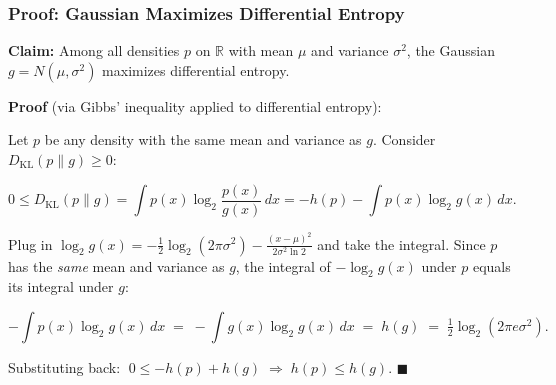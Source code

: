 \documentclass[aspectratio=169]{beamer}
\begin{document}
\begin{frame}
\frametitle{Proof: Gaussian Maximizes Differential Entropy}

\small
\textbf{Claim:} Among all densities $p$ on $\mathbb{R}$ with mean $\mu$ and variance $\sigma^2$, the Gaussian $g = N(\mu, \sigma^2)$ maximizes differential entropy.

\vspace{0.1cm}
\textbf{Proof} (via Gibbs' inequality applied to differential entropy):

\vspace{0.05cm}
Let $p$ be any density with the same mean and variance as $g$. Consider $D_{\text{KL}}(p \| g) \geq 0$:

\vspace{-0.1cm}
$$0 \leq D_{\text{KL}}(p \| g) = \int p(x) \log_2 \frac{p(x)}{g(x)}\,dx = -h(p) - \int p(x) \log_2 g(x)\,dx.$$

\vspace{0.05cm}
Plug in $\log_2 g(x) = -\tfrac{1}{2}\log_2(2\pi\sigma^2) - \tfrac{(x-\mu)^2}{2\sigma^2 \ln 2}$ and take the integral. Since $p$ has the \emph{same} mean and variance as $g$, the integral of $-\log_2 g(x)$ under $p$ equals its integral under $g$:

\pause
\vspace{-0.1cm}
$$-\int p(x) \log_2 g(x)\,dx \;=\; -\int g(x) \log_2 g(x)\,dx \;=\; h(g) \;=\; \tfrac{1}{2}\log_2(2\pi e \sigma^2).$$

\vspace{-0.05cm}
Substituting back: $\;0 \leq -h(p) + h(g) \;\Rightarrow\; h(p) \leq h(g)$. \;$\blacksquare$

\vspace{0.05cm}
\begin{center}
\end{center}
\end{frame}
\end{document}
